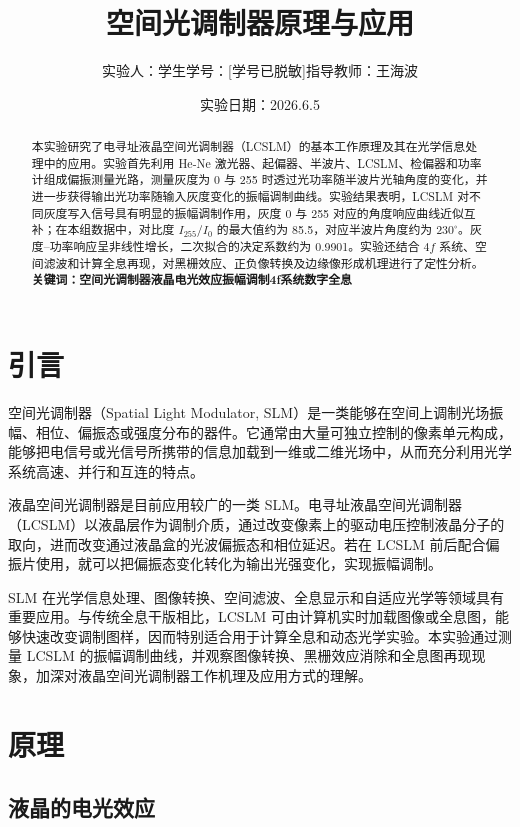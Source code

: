 \documentclass[a4paper]{ctexart}
\title{空间光调制器原理与应用}
\author{实验人：学生\qquad 学号：[学号已脱敏]\qquad 指导教师：王海波}
\date{实验日期：2026.6.5}
\begin{document}
\maketitle

\begin{abstract}
本实验研究了电寻址液晶空间光调制器（LCSLM）的基本工作原理及其在光学信息处理中的应用。实验首先利用 He-Ne 激光器、起偏器、半波片、LCSLM、检偏器和功率计组成偏振测量光路，测量灰度为 0 与 255 时透过光功率随半波片光轴角度的变化，并进一步获得输出光功率随输入灰度变化的振幅调制曲线。实验结果表明，LCSLM 对不同灰度写入信号具有明显的振幅调制作用，灰度 0 与 255 对应的角度响应曲线近似互补；在本组数据中，对比度 $I_{255}/I_0$ 的最大值约为 85.5，对应半波片角度约为 $230^\circ$。灰度--功率响应呈非线性增长，二次拟合的决定系数约为 0.9901。实验还结合 $4f$ 系统、空间滤波和计算全息再现，对黑栅效应、正负像转换及边缘像形成机理进行了定性分析。\\

\textbf{关键词：空间光调制器\quad 液晶电光效应\quad 振幅调制\quad 4f系统\quad 数字全息}
\end{abstract}

\section{引言}

空间光调制器（Spatial Light Modulator, SLM）是一类能够在空间上调制光场振幅、相位、偏振态或强度分布的器件。它通常由大量可独立控制的像素单元构成，能够把电信号或光信号所携带的信息加载到一维或二维光场中，从而充分利用光学系统高速、并行和互连的特点。

液晶空间光调制器是目前应用较广的一类 SLM。电寻址液晶空间光调制器（LCSLM）以液晶层作为调制介质，通过改变像素上的驱动电压控制液晶分子的取向，进而改变通过液晶盒的光波偏振态和相位延迟。若在 LCSLM 前后配合偏振片使用，就可以把偏振态变化转化为输出光强变化，实现振幅调制。

SLM 在光学信息处理、图像转换、空间滤波、全息显示和自适应光学等领域具有重要应用。与传统全息干版相比，LCSLM 可由计算机实时加载图像或全息图，能够快速改变调制图样，因而特别适合用于计算全息和动态光学实验。本实验通过测量 LCSLM 的振幅调制曲线，并观察图像转换、黑栅效应消除和全息图再现现象，加深对液晶空间光调制器工作机理及应用方式的理解。

\section{原理}

\subsection{液晶的电光效应}
\end{document}
